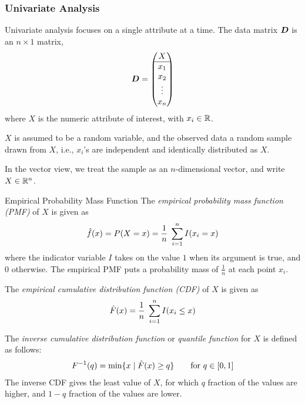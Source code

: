 
\date{Chapter 2: Numeric Attributes}

\begin{frame}
\titlepage
\end{frame}


\begin{frame}
  \frametitle{Univariate Analysis}
Univariate analysis focuses on a single attribute at a time.
The data matrix ${\boldsymbol D}$ is an $n \times 1$ matrix,
\begin{align*}
    {\boldsymbol D} = \begin{pmatrix} X\\
        \hline x_1\\x_2\\\vdots\\ x_n \end{pmatrix}
\end{align*}
where $X$ is the numeric attribute of interest,
with $x_i \in {\mathord{\mathbb R}}$.

\bigskip
$X$ is assumed to be a random variable, and 
the observed data a random
sample drawn from $X$, i.e., $x_i$'s  are
independent and identically distributed as $X$.

\bigskip
In the vector view, we treat the sample
as an $n$-dimensional vector, and write $X \in {\mathord{\mathbb R}}^n$.
\end{frame}


\begin{frame}{Empirical Probability Mass Function}
The {\em empirical probability mass
function (PMF)} of $X$
is given as
\begin{align*}
    \kern3pt\hat{\kern-3pt f}(x) = P(X=x) = \frac{1}{n}\;\sum_{i=1}^n I(x_i=x)
\end{align*}
where the indicator variable $I$ takes on the value $1$ when its
argument is true, and $0$ otherwise.
The empirical PMF puts a probability mass of $\tfrac{1}{n}$
at each point $x_i$.

\bigskip
The {\em empirical cumulative distribution
function (CDF)}
of $X$ is given as
\begin{align*}
    \hat{F}(x) = \frac{1}{n}\;\sum_{i=1}^n I(x_i \le x)
\end{align*}

\bigskip
The {\em inverse cumulative distribution function}
or
{\em quantile function}
for $X$ is defined as follows:
\begin{align*}
    F^{-1}(q) = \min\{x\;|\; \hat{F}(x) \ge q\} \qquad \text{for } q \in
    [0,1]
\end{align*}
The inverse CDF gives the least value of $X$,
for which $q$ fraction of the values are higher, and $1-q$
fraction of the values are lower.
\end{frame}


